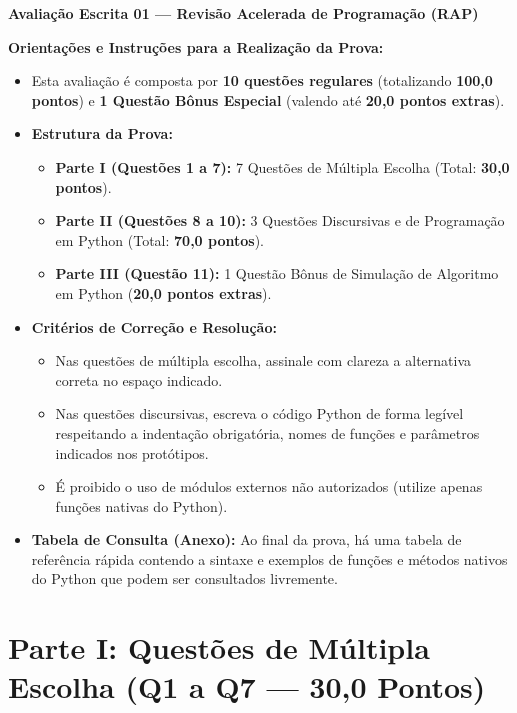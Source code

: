 \vspace{0.8cm}

\noindent \textbf{\Large Avaliação Escrita 01 — Revisão Acelerada de Programação (RAP)}

\vspace{0.3cm}
\noindent \textbf{Orientações e Instruções para a Realização da Prova:}
\begin{itemize}[leftmargin=*]
    \item Esta avaliação é composta por \textbf{10 questões regulares} (totalizando \textbf{100,0 pontos}) e \textbf{1 Questão Bônus Especial} (valendo até \textbf{20,0 pontos extras}).
    \item \textbf{Estrutura da Prova:}
    \begin{itemize}
        \item \textbf{Parte I (Questões 1 a 7):} 7 Questões de Múltipla Escolha (Total: \textbf{30,0 pontos}).
        \item \textbf{Parte II (Questões 8 a 10):} 3 Questões Discursivas e de Programação em Python (Total: \textbf{70,0 pontos}).
        \item \textbf{Parte III (Questão 11):} 1 Questão Bônus de Simulação de Algoritmo em Python (\textbf{20,0 pontos extras}).
    \end{itemize}
    \item \textbf{Critérios de Correção e Resolução:}
    \begin{itemize}
        \item Nas questões de múltipla escolha, assinale com clareza a alternativa correta no espaço indicado.
        \item Nas questões discursivas, escreva o código Python de forma legível respeitando a indentação obrigatória, nomes de funções e parâmetros indicados nos protótipos.
        \item É proibido o uso de módulos externos não autorizados (utilize apenas funções nativas do Python).
    \end{itemize}
    \item \textbf{Tabela de Consulta (Anexo):} Ao final da prova, há uma tabela de referência rápida contendo a sintaxe e exemplos de funções e métodos nativos do Python que podem ser consultados livremente.
\end{itemize}

\vspace{0.4cm}

\section*{Parte I: Questões de Múltipla Escolha (Q1 a Q7 — 30,0 Pontos)}

